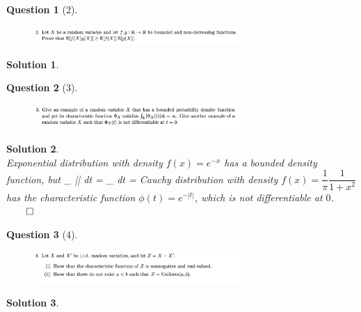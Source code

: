\documentclass{article} %
\def\eQb#1\eQe{\begin{eqnarray*}#1\end{eqnarray*}}
\theoremstyle{quest}
\newtheorem*{question}{Question}
\newtheorem*{solution}{Solution}
\begin{document}
\newpage

\begin{question}[2]
\hfill
\begin{figure}[h!]
  \centering
    \includegraphics[width=0.7\textwidth]{prob-e3-p2.png}
\end{figure}
\end{question}
\begin{solution} \hfill \\
\end{solution}

\newpage

\begin{question}[3]
\hfill
\begin{figure}[h!]
  \centering
    \includegraphics[width=0.7\textwidth]{prob-e3-p3.png}
\end{figure}
\end{question}
\begin{solution} \hfill \\
Exponential distribution with density $f(x) = e^{-x}$ 
has a bounded density function, but 
\eQb
\int_{} || dt = \int_{} 
dt = \infty 
\eQe
Cauchy distribution with density $f(x) = \dfrac{1}{\pi} \dfrac{1}{1+x^2}$ 
has the characteristic function $\phi(t) = e^{-|t|}$, which is not differentiable 
at $0$. \hfill $\qed$
\end{solution}

\newpage

\begin{question}[4]
\hfill
\begin{figure}[h!]
  \centering
    \includegraphics[width=0.7\textwidth]{prob-e3-p4.png}
\end{figure}
\end{question}
\begin{solution} \hfill \\
\end{solution}
\end{document}
